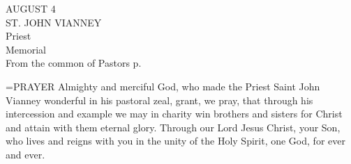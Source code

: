\begin{center}\normalsize AUGUST 4\\
\footnotesize ST. JOHN VIANNEY\\
\footnotesize Priest \\
\footnotesize Memorial\\
\footnotesize From the common of Pastors p. \\
\end{center}

\hangindent=\parindent \small{PRAYER 
Almighty and merciful God,
who made the Priest Saint John Vianney
wonderful in his pastoral zeal,
grant, we pray,
that through his intercession and example
we may in charity win brothers and sisters for Christ
and attain with them eternal glory.
Through our Lord Jesus Christ, your Son,
who lives and reigns with you in the unity of the Holy Spirit,
one God, for ever and ever.\\}
 
